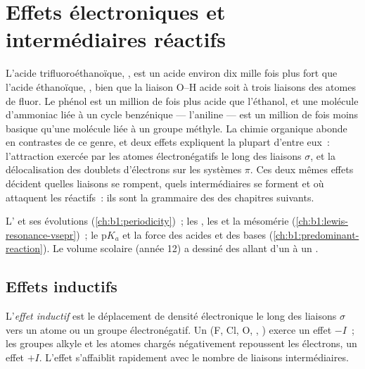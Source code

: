 \chapter{Effets électroniques et intermédiaires réactifs}\label{ch:b1:electronic-effects}

L'acide trifluoroéthanoïque, , est un acide environ dix
mille fois plus fort que l'acide éthanoïque, , bien que la
liaison O--H acide soit à trois liaisons des atomes de fluor. Le phénol
est un million de fois plus acide que l'éthanol, et une molécule
d'ammoniac liée à un cycle benzénique --- l'aniline --- est un million de
fois moins basique qu'une molécule liée à un groupe méthyle. La chimie
organique abonde en contrastes de ce genre, et deux effets expliquent la
plupart d'entre eux~: l'attraction exercée par les atomes
électronégatifs le long des liaisons $\sigma$, et la délocalisation des
doublets d'électrons sur les systèmes $\pi$. Ces deux mêmes effets
décident quelles liaisons se rompent, quels intermédiaires se forment et
où attaquent les réactifs~: ils sont la grammaire des  des chapitres suivants.

\begin{recall}
L' et ses évolutions (\cref{ch:b1:periodicity})~; les
, les  et la mésomérie
(\cref{ch:b1:lewis-resonance-vsepr})~; le $\mathrm{p}K_a$ et la force
des acides et des bases (\cref{ch:b1:predominant-reaction}). Le volume
scolaire (année 12) a dessiné des  allant d'un 
à un .
\end{recall}

\section{Effets inductifs}

\begin{definition}\label{def:b1:electronic-effects:inductive}
L'\emph{effet inductif} est le déplacement de
densité électronique le long des liaisons $\sigma$ vers un atome ou un
groupe électronégatif. Un  (F, Cl, O, ,
) exerce un effet $-I$~; les groupes alkyle et les atomes
chargés négativement repoussent les électrons, un effet $+I$. L'effet
s'affaiblit rapidement avec le nombre de liaisons intermédiaires.
\end{definition}

